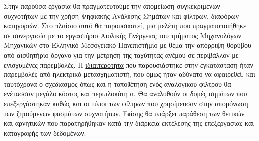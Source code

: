 \documentclass[11pt]{article}
\begin{document}
Στην παρούσα εργασία θα πραγματευτούμε την απομείωση συγκεκριμένων
συχνοτήτων με την χρήση Ψηφιακής Ανάλυσης Σημάτων και φίλτρων, διαφόρων
κατηγοριών. Στο πλαίσιο αυτό θα παρουσιαστεί, μια μελέτη που
πραγματοποιήθηκε σε συνεργασία με το εργαστήριο Αιολικής Ενέργειας του
τμήματος Μηχανολόγων Μηχανικών στο Ελληνικό Μεσογειακό Πανεπιστήμιο με
θέμα την απόρριψη θορύβου από αισθητήριο όργανο για την μέτρηση της
ταχύτητας ανέμου σε περιβάλλον με ενισχυμένες παρεμβολές. Η
\uline{ιδιαιτερότητα} που παρουσιάστηκε στην εγκατάσταση ήταν παρεμβολές από
ηλεκτρικό μετασχηματιστή, που όμως ήταν αδύνατο να
αφαιρεθεί, και ταυτόχρονα ο σχεδιασμός όπως και η τοποθέτηση ενός
αναλογικού φίλτρου θα ενέτασσαν μεγάλο κόστος και περιπλοκότητα. Θα
αναλυθούν οι δομές σημάτων που επεξεργάστηκαν καθώς και οι τύποι των
φίλτρων που χρησίμευσαν στην απομόνωση των ζητούμενων φασμάτων συχνοτήτων.
Επίσης θα υπάρξει παράθεση των θετικών και αρνητικών που παρατηρήθηκαν κατά την
διάρκεια εκτέλεσης της επεξεργασίας και καταγραφής των δεδομένων.
\end{document}
